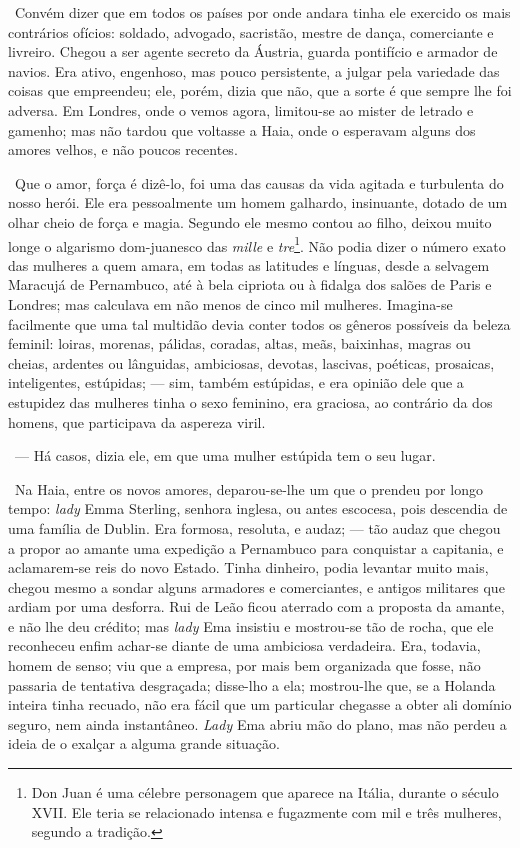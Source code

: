 ~Convém dizer que em todos os países por onde andara tinha ele exercido
os mais contrários ofícios: soldado, advogado, sacristão, mestre de
dança, comerciante e livreiro. Chegou a ser agente secreto da Áustria,
guarda pontifício e armador de navios. Era ativo, engenhoso, mas pouco
persistente, a julgar pela variedade das coisas que empreendeu; ele,
porém, dizia que não, que a sorte é que sempre lhe foi adversa. Em
Londres, onde o vemos agora, limitou-se ao mister de letrado e gamenho;
mas não tardou que voltasse a Haia, onde o esperavam alguns dos amores
velhos, e não poucos recentes.

~Que o amor, força é dizê-lo, foi uma das causas da vida agitada e
turbulenta do nosso herói. Ele era pessoalmente um homem galhardo,
insinuante, dotado de um olhar cheio de força e magia. Segundo ele mesmo
contou ao filho, deixou muito longe o algarismo dom-juanesco das
\emph{mille} e \emph{tre}\footnote{Don Juan é uma célebre personagem que
  aparece na Itália, durante o século XVII. Ele teria se relacionado
  intensa e fugazmente com mil e três mulheres, segundo a tradição.}.
Não podia dizer o número exato das mulheres a quem amara, em todas as
latitudes e línguas, desde a selvagem Maracujá de Pernambuco, até à bela
cipriota ou à fidalga dos salões de Paris e Londres; mas calculava em
não menos de cinco mil mulheres. Imagina-se facilmente que uma tal
multidão devia conter todos os gêneros possíveis da beleza feminil:
loiras, morenas, pálidas, coradas, altas, meãs, baixinhas, magras ou
cheias, ardentes ou lânguidas, ambiciosas, devotas, lascivas, poéticas,
prosaicas, inteligentes, estúpidas; --- sim, também estúpidas, e era
opinião dele que a estupidez das mulheres tinha o sexo feminino, era
graciosa, ao contrário da dos homens, que participava da aspereza viril.

~--- Há casos, dizia ele, em que uma mulher estúpida tem o seu lugar.

~Na Haia, entre os novos amores, deparou-se-lhe um que o prendeu por
longo tempo: \emph{lady} Emma Sterling, senhora inglesa, ou antes
escocesa, pois descendia de uma família de Dublin. Era formosa,
resoluta, e audaz; --- tão audaz que chegou a propor ao amante uma
expedição a Pernambuco para conquistar a capitania, e aclamarem-se reis
do novo Estado. Tinha dinheiro, podia levantar muito mais, chegou mesmo
a sondar alguns armadores e comerciantes, e antigos militares que ardiam
por uma desforra. Rui de Leão ficou aterrado com a proposta da amante, e
não lhe deu crédito; mas \emph{lady} Ema insistiu e mostrou-se tão de
rocha, que ele reconheceu enfim achar-se diante de uma ambiciosa
verdadeira. Era, todavia, homem de senso; viu que a empresa, por mais
bem organizada que fosse, não passaria de tentativa desgraçada;
disse-lho a ela; mostrou-lhe que, se a Holanda inteira tinha recuado,
não era fácil que um particular chegasse a obter ali domínio seguro, nem
ainda instantâneo. \emph{Lady} Ema abriu mão do plano, mas não perdeu a
ideia de o exalçar a alguma grande situação.

